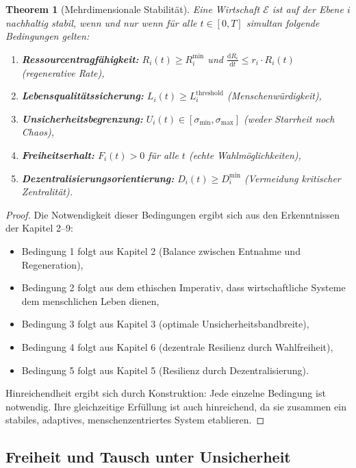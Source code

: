 \documentclass[a4paper, 12pt, twoside, openright]{report}
\newtheorem{theorem}{Theorem}[section]
\theoremstyle{definition}
\theoremstyle{definition}
\begin{document}
\begin{theorem}[Mehrdimensionale Stabilität]
\label{thm:mehrdimensionale-stabilitaet}
Eine Wirtschaft $\mathcal{E}$ ist auf der Ebene $i$ nachhaltig stabil, wenn und nur wenn für alle $t \in [0,T]$ simultan folgende Bedingungen gelten:

\begin{enumerate}
\item \textbf{Ressourcentragfähigkeit:} $R_i(t) \geq R_i^{\min}$ und $\frac{\mathrm{d}R_i}{\mathrm{d}t} \leq r_i \cdot R_i(t)$ (regenerative Rate),
\item \textbf{Lebensqualitätssicherung:} $L_i(t) \geq L_i^{\text{threshold}}$ (Menschenwürdigkeit),
\item \textbf{Unsicherheitsbegrenzung:} $U_i(t) \in [\sigma_{\min}, \sigma_{\max}]$ (weder Starrheit noch Chaos),
\item \textbf{Freiheitserhalt:} $F_i(t) > 0$ für alle $t$ (echte Wahlmöglichkeiten),
\item \textbf{Dezentralisierungsorientierung:} $D_i(t) \geq D_i^{\min}$ (Vermeidung kritischer Zentralität).
\end{enumerate}
\end{theorem}

\begin{proof}
Die Notwendigkeit dieser Bedingungen ergibt sich aus den Erkenntnissen der Kapitel 2--9:

\begin{itemize}
\item Bedingung 1 folgt aus Kapitel 2 (Balance zwischen Entnahme und Regeneration),
\item Bedingung 2 folgt aus dem ethischen Imperativ, dass wirtschaftliche Systeme dem menschlichen Leben dienen,
\item Bedingung 3 folgt aus Kapitel 3 (optimale Unsicherheitsbandbreite),
\item Bedingung 4 folgt aus Kapitel 6 (dezentrale Resilienz durch Wahlfreiheit),
\item Bedingung 5 folgt aus Kapitel 5 (Resilienz durch Dezentralisierung).
\end{itemize}

Hinreichendheit ergibt sich durch Konstruktion: Jede einzelne Bedingung ist notwendig. Ihre gleichzeitige Erfüllung ist auch hinreichend, da sie zusammen ein stabiles, adaptives, menschenzentriertes System etablieren.
\end{proof}

\subsection{Freiheit und Tausch unter Unsicherheit}
\end{document}
